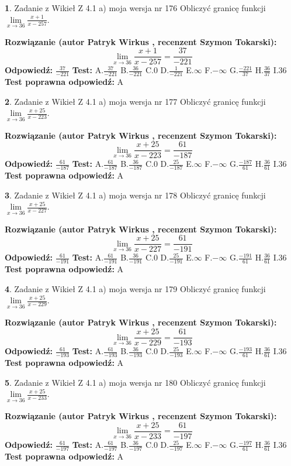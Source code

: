 \documentclass[12pt, a4paper]{article}
\theoremstyle{definition} %
\newtheorem{zad}{}
\newcommand{\zadStart}[1]{\begin{zad}#1\newline}
\newcommand{\zadStop}{\end{zad}}
\newcommand{\rozwStart}[2]{\noindent \textbf{Rozwiązanie (autor #1 , recenzent #2): }\newline}
\newcommand{\rozwStop}{\newline}
\newcommand{\odpStart}{\noindent \textbf{Odpowiedź:}\newline}
\newcommand{\odpStop}{\newline}
\newcommand{\testStart}{\noindent \textbf{Test:}\newline}
\newcommand{\testStop}{\newline}
\newcommand{\kluczStart}{\noindent \textbf{Test poprawna odpowiedź:}\newline}
\newcommand{\kluczStop}{\newline}
\begin{document}
\zadStart{Zadanie z Wikieł Z 4.1 a) moja wersja nr 176}
Obliczyć granicę funkcji $\lim\limits_{x\to36}\frac{x+1}{x-257}$.
\zadStop
\rozwStart{Patryk Wirkus}{Szymon Tokarski}
$$\lim\limits_{x\to36}\frac{x+1}{x-257} = \frac{37}{-221}$$
\rozwStop
\odpStart
$\frac{37}{-221}$
\odpStop
\testStart
A.$\frac{37}{-221}$
B.$\frac{36}{-221}$
C.$0$
D.$\frac{1}{-221}$
E.$\infty$
F.$-\infty$
G.$\frac{-221}{37}$
H.$\frac{36}{37}$
I.$36$
\testStop
\kluczStart
A
\kluczStop



\zadStart{Zadanie z Wikieł Z 4.1 a) moja wersja nr 177}
Obliczyć granicę funkcji $\lim\limits_{x\to36}\frac{x+25}{x-223}$.
\zadStop
\rozwStart{Patryk Wirkus}{Szymon Tokarski}
$$\lim\limits_{x\to36}\frac{x+25}{x-223} = \frac{61}{-187}$$
\rozwStop
\odpStart
$\frac{61}{-187}$
\odpStop
\testStart
A.$\frac{61}{-187}$
B.$\frac{36}{-187}$
C.$0$
D.$\frac{25}{-187}$
E.$\infty$
F.$-\infty$
G.$\frac{-187}{61}$
H.$\frac{36}{61}$
I.$36$
\testStop
\kluczStart
A
\kluczStop



\zadStart{Zadanie z Wikieł Z 4.1 a) moja wersja nr 178}
Obliczyć granicę funkcji $\lim\limits_{x\to36}\frac{x+25}{x-227}$.
\zadStop
\rozwStart{Patryk Wirkus}{Szymon Tokarski}
$$\lim\limits_{x\to36}\frac{x+25}{x-227} = \frac{61}{-191}$$
\rozwStop
\odpStart
$\frac{61}{-191}$
\odpStop
\testStart
A.$\frac{61}{-191}$
B.$\frac{36}{-191}$
C.$0$
D.$\frac{25}{-191}$
E.$\infty$
F.$-\infty$
G.$\frac{-191}{61}$
H.$\frac{36}{61}$
I.$36$
\testStop
\kluczStart
A
\kluczStop



\zadStart{Zadanie z Wikieł Z 4.1 a) moja wersja nr 179}
Obliczyć granicę funkcji $\lim\limits_{x\to36}\frac{x+25}{x-229}$.
\zadStop
\rozwStart{Patryk Wirkus}{Szymon Tokarski}
$$\lim\limits_{x\to36}\frac{x+25}{x-229} = \frac{61}{-193}$$
\rozwStop
\odpStart
$\frac{61}{-193}$
\odpStop
\testStart
A.$\frac{61}{-193}$
B.$\frac{36}{-193}$
C.$0$
D.$\frac{25}{-193}$
E.$\infty$
F.$-\infty$
G.$\frac{-193}{61}$
H.$\frac{36}{61}$
I.$36$
\testStop
\kluczStart
A
\kluczStop



\zadStart{Zadanie z Wikieł Z 4.1 a) moja wersja nr 180}
Obliczyć granicę funkcji $\lim\limits_{x\to36}\frac{x+25}{x-233}$.
\zadStop
\rozwStart{Patryk Wirkus}{Szymon Tokarski}
$$\lim\limits_{x\to36}\frac{x+25}{x-233} = \frac{61}{-197}$$
\rozwStop
\odpStart
$\frac{61}{-197}$
\odpStop
\testStart
A.$\frac{61}{-197}$
B.$\frac{36}{-197}$
C.$0$
D.$\frac{25}{-197}$
E.$\infty$
F.$-\infty$
G.$\frac{-197}{61}$
H.$\frac{36}{61}$
I.$36$
\testStop
\kluczStart
A
\kluczStop
\end{document}

